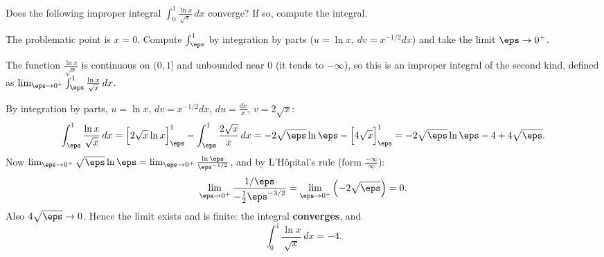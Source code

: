 
\begin{question}
Does the following improper integral $\displaystyle\int_0^1\frac{\ln x}{\sqrt x}\,dx$ converge? If so, compute the integral.
\end{question}

\begin{hint}
The problematic point is $x=0$. Compute $\int_\eps^1$ by integration by parts ($u=\ln x$, $dv=x^{-1/2}dx$) and take the limit $\eps\to0^+$.
\end{hint}

\begin{solution}
The function $\frac{\ln x}{\sqrt x}$ is continuous on $(0,1]$ and unbounded near $0$ (it tends to $-\infty$), so this is an improper integral of the second kind, defined as $\lim_{\eps\to0^+}\int_\eps^1\frac{\ln x}{\sqrt x}\,dx$.

By integration by parts, $u=\ln x$, $dv=x^{-1/2}dx$, $du=\frac{dx}x$, $v=2\sqrt x$:
\[ \int_\eps^1\frac{\ln x}{\sqrt x}\,dx=\Big[2\sqrt x\ln x\Big]_\eps^1-\int_\eps^1\frac{2\sqrt x}{x}\,dx=-2\sqrt\eps\ln\eps-\Big[4\sqrt x\Big]_\eps^1=-2\sqrt\eps\ln\eps-4+4\sqrt\eps. \]
Now $\lim_{\eps\to0^+}\sqrt\eps\ln\eps=\lim_{\eps\to0^+}\frac{\ln\eps}{\eps^{-1/2}}$, and by L'Hôpital's rule (form $\frac{-\infty}{\infty}$):
\[ \lim_{\eps\to0^+}\frac{1/\eps}{-\frac12\eps^{-3/2}}=\lim_{\eps\to0^+}\left(-2\sqrt\eps\right)=0. \]
Also $4\sqrt\eps\to0$. Hence the limit exists and is finite: the integral \textbf{converges}, and
\[ \int_0^1\frac{\ln x}{\sqrt x}\,dx=-4. \]
\end{solution}
